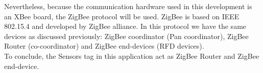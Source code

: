  Nevertheless, because the communication hardware used in this development is an XBee board, the ZigBee protocol will be used. ZigBee is based on IEEE 802.15.4 and developed by ZigBee alliance. In this protocol we have the same devices as discussed previously: ZigBee coordinator (Pan coordinator), ZigBee Router (co-coordinator) and ZigBee end-devices (RFD devices).\cite{zigbee}\\
 To conclude, the Sensors tag in this application act as ZigBee Router and ZigBee end-device.
\\
